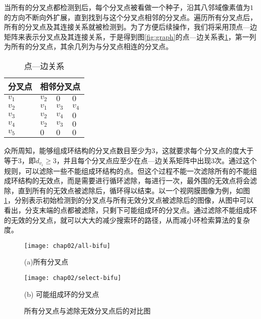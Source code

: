 当所有的分叉点都检测到后，每个分叉点被看做一个种子，沿其八邻域像素值为$1$的方向不断向外扩展，直到找到与这个分叉点相邻的分叉点。遍历所有分叉点后，所有的分叉点及其连接关系就被检测到。为了方便后续操作，我们将采用顶点---边矩阵来表示分叉点及其连接关系，于是得到图\ref{fig:graph}的点---边关系表\ref{tab:AdjacentStructure}，第一列为所有的分叉点，其余几列为与分叉点相连的分叉点。
\renewcommand\arraystretch{0.8}
\begin{table}[H]
\caption{点---边关系}
\centering
\begin{tabular}{p{2cm}<{\centering}p{1cm}<{\centering}p{1cm}<{\centering}p{1cm}<{\centering}}
  \hline
  分叉点 & \multicolumn{3}{c}{相邻分叉点}\\
  \hline
  \rowcolor{gray!50}
  $v_{1}$ & $v_{2}$  & $0$      & $0$  \\
  $v_{2}$ & $v_{1}$  & $v_{3}$  & $v_{4}$ \\
  \rowcolor{gray!50}
  $v_{3}$ & $v_{2}$  & $v_{4}$  & $0$\\
  $v_{4}$ & $v_{2}$  & $v_{3}$  & $0$ \\
  \rowcolor{gray!50}
  $v_{5}$ & $0$      & $0$      & $0$\\
  \hline
\end{tabular}
\label{tab:AdjacentStructure}
\end{table}

众所周知，能够组成环结构的分叉点数目至少为$3$，这就要求每个分叉点的度大于等于$3$，即$d_{v_i} \geq 3$，并且每个分叉点应至少在点---边关系矩阵中出现$3$次。通过这个规则，可以滤除一些不能组成环结构的点。但这个过程不能一次滤除所有的不能组成环结构的无效点，而是需要进行循环滤除，每进行一次，最外围的无效点将会滤除，直到所有的无效点被滤除后，循环得以结束。以一个视网膜图像为例，如图\ref{fig:Bifurcation}，分别表示初始检测到的分叉点与所有无效分叉点被滤除后的图像，从图中可以看出，分支末端的点都被滤除，只剩下可能组成环的分叉点。通过滤除不能组成环的无效的分叉点，就可以大大的减少搜索环的路径，从而减小环检索算法的复杂度。

\begin{figure}
\centering
  \begin{minipage}[b]{0.48\textwidth} 
      \centering 
      \texttt{[image: chap02/all-bifu]}
        \centerline{(a)所有分叉点}\medskip
	 \label{fig:3FeaturePoint}
    \end{minipage}
  \begin{minipage}[b]{0.48\textwidth}
    \centering
    \texttt{[image: chap02/select-bifu]}
      \centerline{(b) 可能组成环的分叉点}\medskip
	\label{fig:4FeaturePoint}
  \end{minipage}
\caption{所有分叉点与滤除无效分叉点后的对比图}
\label{fig:Bifurcation}
\end{figure}

